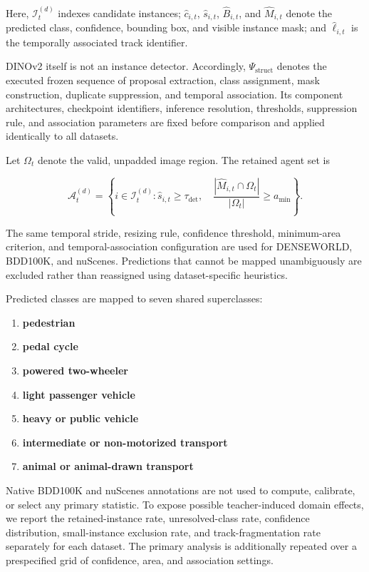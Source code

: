 Here, \(\mathcal I_t^{(d)}\) indexes candidate instances;
\(\hat c_{i,t}\), \(\hat s_{i,t}\), \(\hat B_{i,t}\), and
\(\hat M_{i,t}\) denote the predicted class, confidence, bounding box,
and visible instance mask; and \(\hat\ell_{i,t}\) is the temporally
associated track identifier.

DINOv2 itself is not an instance detector. Accordingly,
\(\Psi_{\mathrm{struct}}\) denotes the executed frozen sequence of
proposal extraction, class assignment, mask construction, duplicate
suppression, and temporal association. Its component architectures,
checkpoint identifiers, inference resolution, thresholds, suppression
rule, and association parameters are fixed before comparison and
applied identically to all datasets.

Let \(\Omega_t\) denote the valid, unpadded image region. The retained
agent set is

\begin{equation*}
\mathcal A_t^{(d)}
=
\left\{
i\in\mathcal I_t^{(d)}:
\hat s_{i,t}\ge\tau_{\mathrm{det}},
\quad
\frac{
|\hat M_{i,t}\cap\Omega_t|
}{
|\Omega_t|
}
\ge a_{\min}
\right\}.
\end{equation*}

The same temporal stride, resizing rule, confidence threshold,
minimum-area criterion, and temporal-association configuration are used
for DENSEWORLD, BDD100K, and nuScenes. Predictions that cannot be
mapped unambiguously are excluded rather than reassigned using
dataset-specific heuristics.

Predicted classes are mapped to seven shared superclasses:

\begin{enumerate}[
    label=(\roman*),
    leftmargin=2.8em,
    itemsep=1pt,
    topsep=2pt,
    parsep=0pt
]
    \item \textbf{pedestrian}
    \item \textbf{pedal cycle}
    \item \textbf{powered two-wheeler}
    \item \textbf{light passenger vehicle}
    \item \textbf{heavy or public vehicle}
    \item \textbf{intermediate or non-motorized transport}
    \item \textbf{animal or animal-drawn transport}
\end{enumerate}
Native BDD100K and nuScenes annotations are not used to compute,
calibrate, or select any primary statistic. To expose possible
teacher-induced domain effects, we report the retained-instance rate,
unresolved-class rate, confidence distribution, small-instance
exclusion rate, and track-fragmentation rate separately for each
dataset. The primary analysis is additionally repeated over a
prespecified grid of confidence, area, and association settings.


